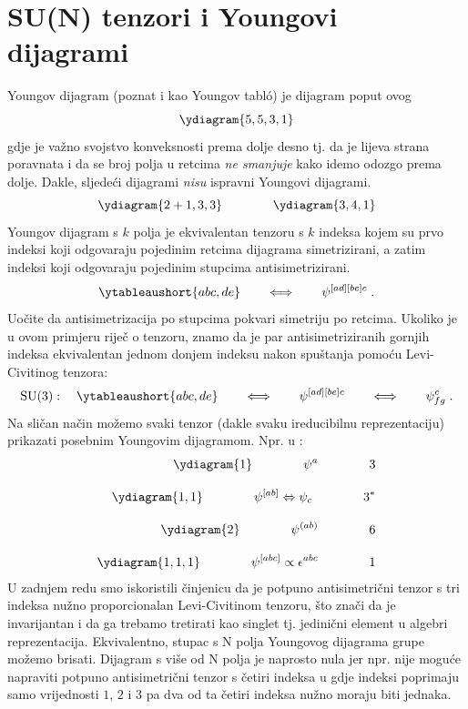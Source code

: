 \section{SU(N) tenzori i Youngovi dijagrami}
  

Youngov dijagram (poznat i kao Youngov tabl\'{o}) je dijagram poput ovog
$$
\ydiagram{5,5,3,1}
$$
gdje je važno svojstvo konveksnosti prema dolje desno tj. da
je lijeva strana poravnata i da se broj polja u retcima
\emph{ne smanjuje} kako idemo odozgo prema dolje.
Dakle, sljedeći dijagrami \emph{nisu} ispravni Youngovi dijagrami.
$$
\ydiagram{2+1,3,3} \qquad  \qquad  \ydiagram{3,4,1}
$$
Youngov dijagram s $k$ polja je ekvivalentan  tenzoru s
$k$ indeksa kojem su prvo indeksi koji odgovaraju pojedinim
retcima dijagrama simetrizirani, a zatim indeksi koji odgovaraju
pojedinim stupcima antisimetrizirani.
\begin{equation}
\ytableaushort{abc, de} \qquad \Longleftrightarrow \qquad
\psi^{[ad][be]c} \;.
\label{eq:tbltensor}
\end{equation}
Uočite da antisimetrizacija po stupcima pokvari simetriju po retcima.
Ukoliko je u ovom primjeru riječ o  tenzoru, znamo da je par
antisimetriziranih gornjih indeksa ekvivalentan jednom donjem indeksu
nakon spuštanja pomoću Levi-Civitinog tenzora:
\begin{equation}
\SU{3}:\quad 
\ytableaushort{abc, de} \qquad \Longleftrightarrow \qquad
\psi^{[ad][be]c} \qquad \Longleftrightarrow \qquad
\psi^{c}_{fg} \;.
\label{eq:tbltensorsu3}
\end{equation}
Na sličan način možemo svaki tenzor (dakle svaku ireducibilnu reprezentaciju) prikazati
posebnim Youngovim dijagramom. Npr. u :
\begin{align}
\ydiagram{1} \qquad\qquad \psi^a \qquad\qquad 3  \\[2ex]
\ydiagram{1,1} \qquad\qquad \psi^{[ab]} \Leftrightarrow \psi_c  \qquad\qquad 3^*  \\[2ex]
\ydiagram{2} \qquad\qquad \psi^{(ab)}  \qquad\qquad 6  \\[2ex]
\ydiagram{1,1,1} \qquad\qquad \psi^{[abc]} \propto \epsilon^{abc} \qquad\qquad 1
\end{align}
U zadnjem redu smo iskoristili činjenicu da je potpuno antisimetrični tenzor s tri
indeksa nužno proporcionalan Levi-Civitinom tenzoru, što znači da je invarijantan i
da ga trebamo tretirati kao singlet tj. jedinični element u algebri
reprezentacija. Ekvivalentno, stupac s N polja
Youngovog dijagrama  grupe možemo brisati. Dijagram s više od N polja
je naprosto nula jer npr. nije moguće napraviti potpuno antisimetrični tenzor
s četiri indeksa u  gdje indeksi poprimaju
samo vrijednosti $1$, $2$ i $3$ pa dva od ta četiri indeksa nužno moraju
biti jednaka.

